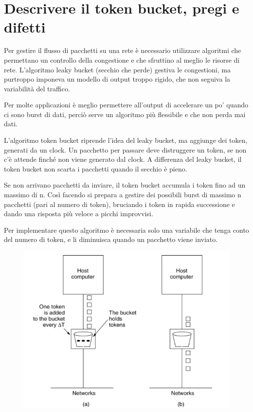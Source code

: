 \section{Descrivere il token bucket, pregi e difetti}

Per gestire il flusso di pacchetti su una rete è necessario utilizzare algoritmi che permettano un controllo della congestione e che sfruttino al meglio le risorse di rete. L’algoritmo leaky bucket (secchio che perde) gestiva le congestioni, ma purtroppo imponeva un modello di output troppo rigido, che non seguiva la variabilità del traffico.

Per molte applicazioni è meglio permettere all’output di accelerare un po’ quando ci sono burst di dati, perciò serve un algoritmo più flessibile e che non perda mai dati.

L’algoritmo token bucket riprende l’idea del leaky bucket, ma aggiunge dei token, generati da un clock.
Un pacchetto per passare deve distruggere un token, se non c’è attende finché non viene generato dal clock. A differenza del leaky bucket, il token bucket non scarta i pacchetti quando il secchio è pieno.

Se non arrivano pacchetti da inviare, il token bucket accumula i token fino ad un massimo di n. Così facendo si prepara a gestire dei possibili burst di massimo n pacchetti (pari al numero di token), bruciando i token in rapida successione e dando una risposta più veloce a picchi improvvisi.

Per implementare questo algoritmo è necessaria solo una variabile che tenga conto del numero di token, e li diminuisca quando un pacchetto viene inviato.

\begin{figure}[H]
\centering
\includegraphics[scale=0.6]{res/img/42_TokenBucket.png}
\end{figure}
 
